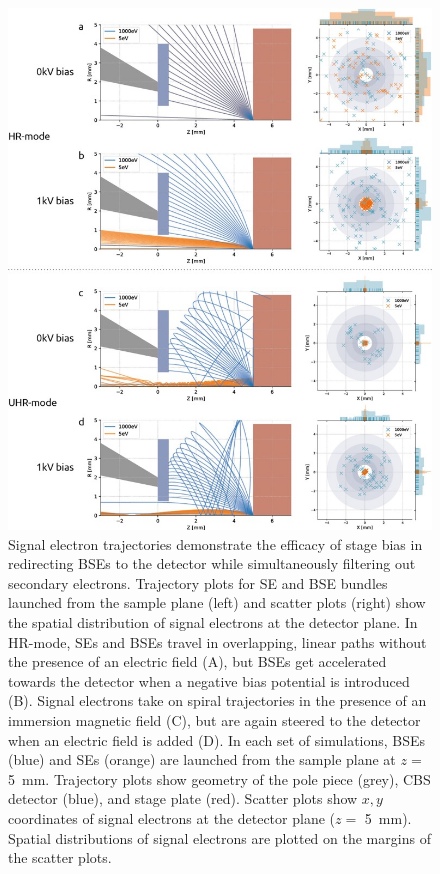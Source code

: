 \begin{figure}[!tb]
    \centering
    \includegraphics[width=0.85\linewidth]{chapter-2/figures_JPEG_LQ/fig2-2_simulations.jpg}
    \caption{Signal electron trajectories demonstrate the efficacy of stage bias in redirecting BSEs to the detector while simultaneously filtering out secondary electrons. Trajectory plots for SE and BSE bundles launched from the sample plane (left) and scatter plots (right) show the spatial distribution of signal electrons at the detector plane. In HR-mode, SEs and BSEs travel in overlapping, linear paths without the presence of an electric field (A), but BSEs get accelerated towards the detector when a negative bias potential is introduced (B). Signal electrons take on spiral trajectories in the presence of an immersion magnetic field (C), but are again steered to the detector when an electric field is added (D). In each set of simulations, BSEs (blue) and SEs (orange) are launched from the sample plane at $z =$ \SI{5}{\milli\meter}. Trajectory plots show geometry of the pole piece (grey), CBS detector (blue), and stage plate (red). Scatter plots show $x, y$ coordinates of signal electrons at the detector plane ($z =$ \SI{5}{\milli\meter}). Spatial distributions of signal electrons are plotted on the margins of the scatter plots.}
    \label{fig:2.2_simulations}
\end{figure}

